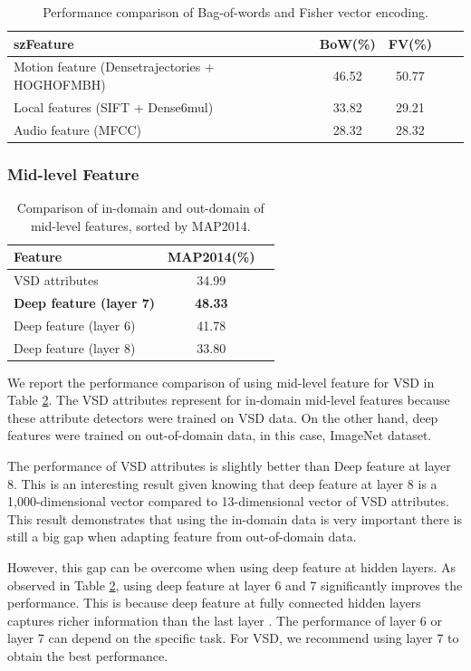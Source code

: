 \documentclass[twocolumn]{bmcart}%
\begin{document}
\begin{table}[htbp]
	\centering
	\caption{Performance comparison of Bag-of-words and Fisher vector encoding.}
	\begin{tabular}{lcccc}
		\hline
		szFeature & BoW(\%) & FV(\%) \\ \hline
		Motion feature (Densetrajectories + HOGHOFMBH) & 46.52 & 50.77 \\
		Local features (SIFT + Dense6mul) & 33.82 & 29.21 \\
		Audio feature (MFCC) & 28.32 & 28.32 \\ \hline
	\end{tabular}%
	\label{tab:bow_fv}%
\end{table}%

\subsubsection{Mid-level Feature}
\begin{table}
	\centering
	\caption{Comparison of in-domain and out-domain of mid-level features, sorted by MAP2014.}
	\begin{tabular}{lcc}
		\hline
		Feature & MAP2014(\%) \\ \hline
		VSD	attributes & 34.99 \\ \hline
		\textbf{Deep feature (layer 7)} &\textbf{ 48.33} \\
		Deep feature (layer 6) & 41.78 \\
		Deep feature (layer 8) & 33.80 \\ \hline
	\end{tabular}%
	\label{tab:midlevel}%
\end{table}%
We report the performance comparison of using mid-level feature for VSD in Table \ref{tab:midlevel}. The VSD attributes represent for in-domain mid-level features because these attribute detectors were trained on VSD data. On the other hand, deep features were trained on out-of-domain data, in this case, ImageNet dataset.

The performance of VSD attributes is slightly better than Deep feature at layer 8. This is an interesting result given knowing that deep feature at layer 8 is a 1,000-dimensional vector compared to 13-dimensional vector of VSD attributes. This result demonstrates that using the in-domain data is very important there is still a big gap when adapting feature from out-of-domain data.

However, this gap can be overcome when using deep feature at hidden layers. As observed in Table \ref{tab:midlevel}, using deep feature at layer 6 and 7 significantly improves the performance. This is because deep feature at fully connected hidden layers captures richer information than the last layer \cite{donahue2013decaf}. The performance of layer 6 or layer 7 can depend on the specific task. For VSD, we recommend using layer 7 to obtain the best performance.
\end{document}
